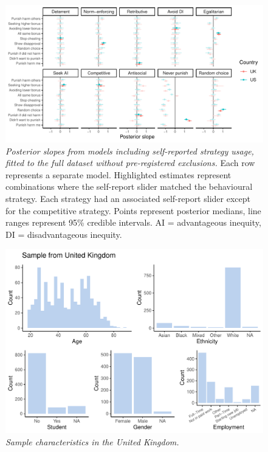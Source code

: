 \documentclass[
  man,floatsintext]{apa6}
\begin{document}
\newpage










\begin{figure}
\centering
\includegraphics{manuscript_files/figure-latex/plotAllSliders1-1.pdf}
\caption{\label{fig:plotAllSliders1}\emph{Posterior slopes from models including
self-reported strategy usage, fitted to the full dataset without pre-registered
exclusions.} Each row represents a separate model. Highlighted estimates
represent combinations where the self-report slider matched the behavioural
strategy. Each strategy had an associated self-report slider except for the
competitive strategy. Points represent posterior medians, line ranges represent
95\% credible intervals. AI = advantageous inequity, DI = disadvantageous
inequity.}
\end{figure}

\newpage



\begin{figure}
\centering
\includegraphics{manuscript_files/figure-latex/plotSampleUK-1.pdf}
\caption{\label{fig:plotSampleUK}\emph{Sample characteristics in the United Kingdom.}}
\end{figure}
\end{document}
